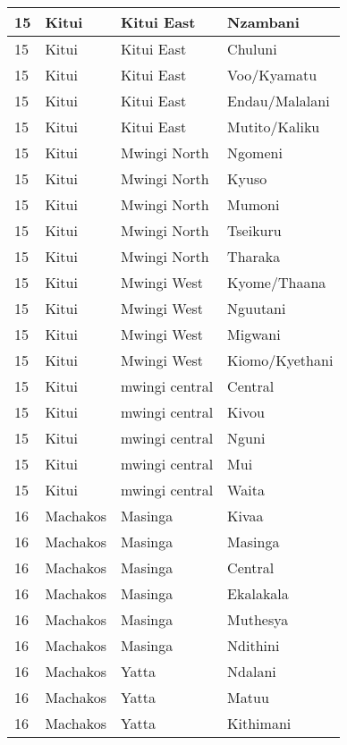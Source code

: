 \begin{table}[!ht]
\begin{tabular}{|l|l|l|l|}
        15 & Kitui & Kitui East & Nzambani \\ \hline
        15 & Kitui & Kitui East & Chuluni \\ \hline
        15 & Kitui & Kitui East & Voo/Kyamatu \\ \hline
        15 & Kitui & Kitui East & Endau/Malalani \\ \hline
        15 & Kitui & Kitui East & Mutito/Kaliku \\ \hline
        15 & Kitui & Mwingi North & Ngomeni \\ \hline
        15 & Kitui & Mwingi North & Kyuso \\ \hline
        15 & Kitui & Mwingi North & Mumoni \\ \hline
        15 & Kitui & Mwingi North & Tseikuru \\ \hline
        15 & Kitui & Mwingi North & Tharaka \\ \hline
        15 & Kitui & Mwingi West & Kyome/Thaana \\ \hline
        15 & Kitui & Mwingi West & Nguutani \\ \hline
        15 & Kitui & Mwingi West & Migwani \\ \hline
        15 & Kitui & Mwingi West & Kiomo/Kyethani \\ \hline
        15 & Kitui & mwingi central & Central \\ \hline
        15 & Kitui & mwingi central & Kivou \\ \hline
        15 & Kitui & mwingi central & Nguni \\ \hline
        15 & Kitui & mwingi central & Mui \\ \hline
        15 & Kitui & mwingi central & Waita \\ \hline
        16 & Machakos & Masinga & Kivaa \\ \hline
        16 & Machakos & Masinga & Masinga \\ \hline
        16 & Machakos & Masinga & Central \\ \hline
        16 & Machakos & Masinga & Ekalakala \\ \hline
        16 & Machakos & Masinga & Muthesya \\ \hline
        16 & Machakos & Masinga & Ndithini \\ \hline
        16 & Machakos & Yatta & Ndalani \\ \hline
        16 & Machakos & Yatta & Matuu \\ \hline
        16 & Machakos & Yatta & Kithimani \\ \hline

\end{tabular}
\end{table}
